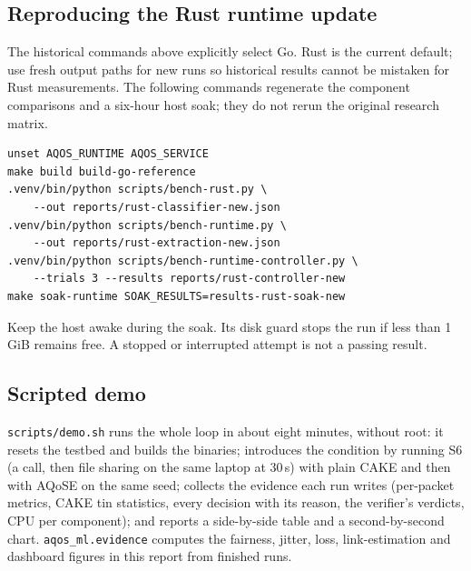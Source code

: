 \documentclass[11pt,a4paper]{article}
\begin{document}
\subsection*{Reproducing the Rust runtime update}
The historical commands above explicitly select Go. Rust is the current default;
use fresh output paths for new runs so historical results cannot be mistaken for
Rust measurements. The following commands regenerate the component comparisons
and a six-hour host soak; they do not rerun the original research matrix.
\begin{verbatim}
unset AQOS_RUNTIME AQOS_SERVICE
make build build-go-reference
.venv/bin/python scripts/bench-rust.py \
    --out reports/rust-classifier-new.json
.venv/bin/python scripts/bench-runtime.py \
    --out reports/rust-extraction-new.json
.venv/bin/python scripts/bench-runtime-controller.py \
    --trials 3 --results reports/rust-controller-new
make soak-runtime SOAK_RESULTS=results-rust-soak-new
\end{verbatim}
Keep the host awake during the soak. Its disk guard stops the run if less than
1\,GiB remains free. A stopped or interrupted attempt is not a passing result.

\subsection*{Scripted demo}
\texttt{scripts/demo.sh} runs the whole loop in about eight minutes, without root: it resets the testbed and builds the binaries; introduces the condition by running S6 (a call, then file sharing on the same laptop at 30\,s) with plain CAKE and then with AQoSE on the same seed; collects the evidence each run writes (per-packet metrics, CAKE tin statistics, every decision with its reason, the verifier's verdicts, CPU per component); and reports a side-by-side table and a second-by-second chart. \texttt{aqos\_ml.evidence} computes the fairness, jitter, loss, link-estimation and dashboard figures in this report from finished runs.
\end{document}
